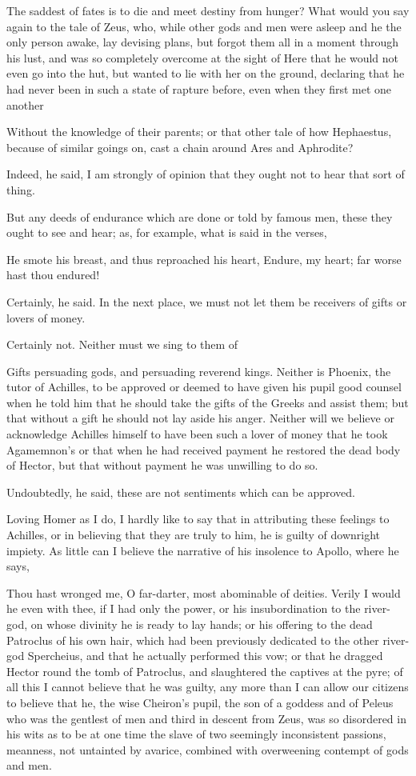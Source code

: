 The saddest of fates is to die and meet destiny from hunger? What would you say again to the tale of Zeus, who, while other gods and men were asleep and he the only person awake, lay devising plans, but forgot them all in a moment through his lust, and was so completely overcome at the sight of Here that he would not even go into the hut, but wanted to lie with her on the ground, declaring that he had never been in such a state of rapture before, even when they first met one another

Without the knowledge of their parents; or that other tale of how Hephaestus, because of similar goings on, cast a chain around Ares and Aphrodite?

Indeed, he said, I am strongly of opinion that they ought not to hear that sort of thing.

But any deeds of endurance which are done or told by famous men, these they ought to see and hear; as, for example, what is said in the verses,

He smote his breast, and thus reproached his heart,
Endure, my heart; far worse hast thou endured!

Certainly, he said.
In the next place, we must not let them be receivers of gifts or lovers of money.

Certainly not.
Neither must we sing to them of

Gifts persuading gods, and persuading reverend kings. Neither is Phoenix, the tutor of Achilles, to be approved or deemed to have given his pupil good counsel when he told him that he should take the gifts of the Greeks and assist them; but that without a gift he should not lay aside his anger. Neither will we believe or acknowledge Achilles himself to have been such a lover of money that he took Agamemnon's or that when he had received payment he restored the dead body of Hector, but that without payment he was unwilling to do so.

Undoubtedly, he said, these are not sentiments which can be approved.

Loving Homer as I do, I hardly like to say that in attributing these feelings to Achilles, or in believing that they are truly to him, he is guilty of downright impiety. As little can I believe the narrative of his insolence to Apollo, where he says,

Thou hast wronged me, O far-darter, most abominable of deities. Verily I would he even with thee, if I had only the power, or his insubordination to the river-god, on whose divinity he is ready to lay hands; or his offering to the dead Patroclus of his own hair, which had been previously dedicated to the other river-god Spercheius, and that he actually performed this vow; or that he dragged Hector round the tomb of Patroclus, and slaughtered the captives at the pyre; of all this I cannot believe that he was guilty, any more than I can allow our citizens to believe that he, the wise Cheiron's pupil, the son of a goddess and of Peleus who was the gentlest of men and third in descent from Zeus, was so disordered in his wits as to be at one time the slave of two seemingly inconsistent passions, meanness, not untainted by avarice, combined with overweening contempt of gods and men.

